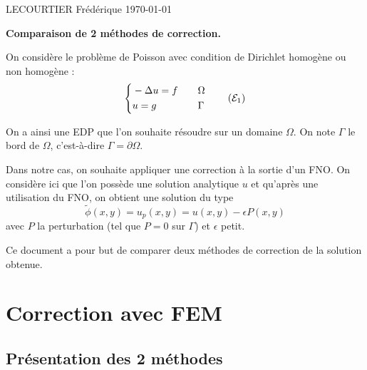 \documentclass[french]{article}
\begin{document}
	LECOURTIER Frédérique \hfill \today
	\begin{center}
		\Large\textbf{{Comparaison de 2 méthodes de correction.}}\\
	\end{center}
	\graphicspath{{images/}}
	
	On considère le problème de Poisson avec condition de Dirichlet homogène ou non homogène :
	\begin{equation}
		\label{pb1}
		\left\{\begin{aligned}
			&-\Delta u=f \quad &&\Omega \\
			&u=g \quad &&\Gamma
		\end{aligned}\right. \tag{$\mathcal{E}_1$}
	\end{equation}
	
	On a ainsi une EDP que l'on souhaite résoudre sur un domaine $\Omega$. On note $\Gamma$ le bord de $\Omega$, c'est-à-dire $\Gamma=\partial\Omega$. 
	
	Dans notre cas, on souhaite appliquer une correction à la sortie d'un FNO.
	On considère ici que l'on possède une solution analytique $u$ et qu'après une utilisation du FNO, on obtient une solution du type
	\begin{equation*}
		\label{phi_tild}
		\tilde{\phi}(x,y)=u_p(x,y) = u(x,y)-\epsilon P(x,y)
	\end{equation*}
	avec $P$ la perturbation (tel que $P=0$ sur $\Gamma$) et $\epsilon$ petit.
	
	Ce document a pour but de comparer deux méthodes de correction de la solution obtenue.
	
	\section{Correction avec FEM}
	
	\subsection{Présentation des 2 méthodes}
	
\end{document}
